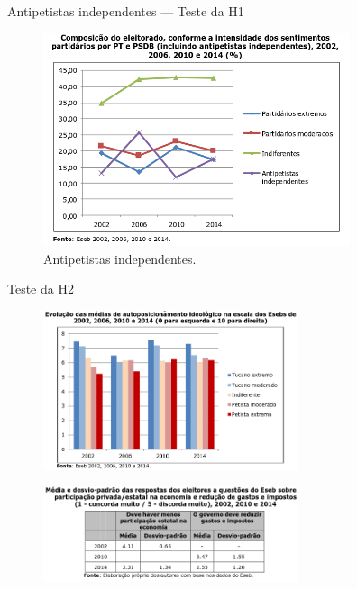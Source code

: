 \documentclass[9pt]{beamer}
\begin{document}
\begin{frame}{Antipetistas independentes --- Teste da H1}
    \begin{figure}[h]
        \includegraphics[width=9cm]{images/antipetistas.png}
        \caption{Antipetistas independentes.}
    \end{figure}
\end{frame}

\begin{frame}{Teste da H2}
    \begin{figure}[ht]
        \begin{minipage}[b]{0.6\linewidth}
            \centering
            \includegraphics[width=7.5cm]{images/medias.png}
            \label{fig:a}
        \end{minipage}
        \hspace{0.8cm}
        \begin{minipage}[b]{0.6\linewidth}
            \centering
            \includegraphics[width=7.5cm]{images/tabela.png}
            \label{fig:b}
        \end{minipage}
    \end{figure}
\end{frame}
\end{document}
